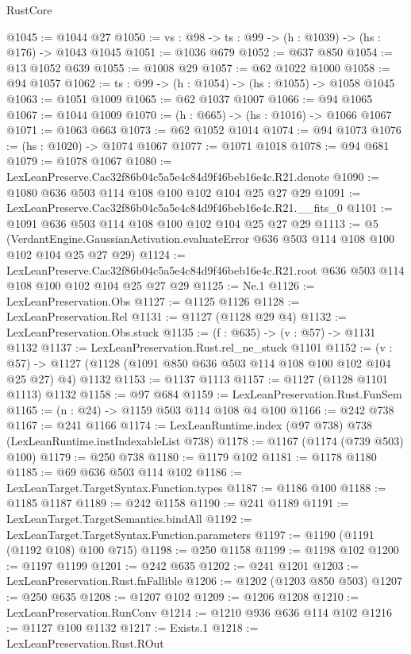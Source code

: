 \begin{lexlean}{RustCore}
\begin{coremodule}
@1045 := @1044 @27
@1050 := {vs : @98} -> {ts : @99} -> (h : @1039) -> (hs : @176) -> @1043 @1045
@1051 := @1036 @679
@1052 := @637 @850
@1054 := @13 @1052 @639
@1055 := @1008 @29
@1057 := @62 @1022 @1000
@1058 := @94 @1057
@1062 := {ts : @99} -> (h : @1054) -> (hs : @1055) -> @1058 @1045
@1063 := @1051 @1009
@1065 := @62 @1037 @1007
@1066 := @94 @1065
@1067 := @1044 @1009
@1070 := (h : @665) -> (hs : @1016) -> @1066 @1067
@1071 := @1063 @663
@1073 := @62 @1052 @1014
@1074 := @94 @1073
@1076 := (hs : @1020) -> @1074 @1067
@1077 := @1071 @1018
@1078 := @94 @681
@1079 := @1078 @1067
@1080 := LexLeanPreserve.Cac32f86b04c5a5e4c84d9f46beb16e4c.R21.denote
@1090 := @1080 @636 @503 @114 @108 @100 @102 @104 @25 @27 @29
@1091 := LexLeanPreserve.Cac32f86b04c5a5e4c84d9f46beb16e4c.R21.__fits_0
@1101 := @1091 @636 @503 @114 @108 @100 @102 @104 @25 @27 @29
@1113 := @5
    (VerdantEngine.GaussianActivation.evaluateError @636 @503 @114 @108 @100 @102 @104 @25 @27 @29)
@1124 := LexLeanPreserve.Cac32f86b04c5a5e4c84d9f46beb16e4c.R21.root
    @636
    @503
    @114
    @108
    @100
    @102
    @104
    @25
    @27
    @29
@1125 := Ne.{1}
@1126 := LexLeanPreservation.Obs
@1127 := @1125 @1126
@1128 := LexLeanPreservation.Rel
@1131 := @1127 (@1128 @29 @4)
@1132 := LexLeanPreservation.Obs.stuck
@1135 := (f : @635) -> (v : @57) -> @1131 @1132
@1137 := LexLeanPreservation.Rust.rel_ne_stuck @1101
@1152 := (v : @57) -> @1127 (@1128 (@1091 @850 @636 @503 @114 @108 @100 @102 @104 @25 @27) @4) @1132
@1153 := @1137 @1113
@1157 := @1127 (@1128 @1101 @1113) @1132
@1158 := @97 @684
@1159 := LexLeanPreservation.Rust.FunSem
@1165 := (n : @24) -> @1159 @503 @114 @108 @4 @100
@1166 := @242 @738
@1167 := @241 @1166
@1174 := LexLeanRuntime.index (@97 @738) @738 (LexLeanRuntime.instIndexableList @738)
@1178 := @1167 (@1174 (@739 @503) @100)
@1179 := @250 @738
@1180 := @1179 @102
@1181 := @1178 @1180
@1185 := @69 @636 @503 @114 @102
@1186 := LexLeanTarget.TargetSyntax.Function.types
@1187 := @1186 @100
@1188 := @1185 @1187
@1189 := @242 @1158
@1190 := @241 @1189
@1191 := LexLeanTarget.TargetSemantics.bindAll
@1192 := LexLeanTarget.TargetSyntax.Function.parameters
@1197 := @1190 (@1191 (@1192 @108) @100 @715)
@1198 := @250 @1158
@1199 := @1198 @102
@1200 := @1197 @1199
@1201 := @242 @635
@1202 := @241 @1201
@1203 := LexLeanPreservation.Rust.fnFallible
@1206 := @1202 (@1203 @850 @503)
@1207 := @250 @635
@1208 := @1207 @102
@1209 := @1206 @1208
@1210 := LexLeanPreservation.RunConv
@1214 := @1210 @936 @636 @114 @102
@1216 := @1127 @100 @1132
@1217 := Exists.{1}
@1218 := LexLeanPreservation.Rust.ROut

\end{coremodule}
\end{lexlean}
